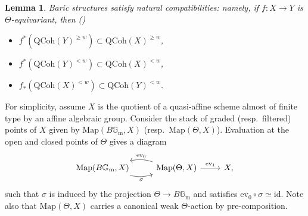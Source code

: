\documentclass{amsart}
\newtheorem{lemma}[theorem]{Lemma}
\theoremstyle{definition}
\theoremstyle{remark}
\numberwithin{equation}{section}
\newcommand{\Gm}{{\mathbb{G}_{\mathrm{m}}}}
\newcommand{\QCoh}{\mathrm{QCoh}}
\newcommand{\id}{\mathrm{id}}
\newcommand{\Map}{\mathrm{Map}}
\newcommand{\ev}{\mathrm{ev}}
\begin{document}
\begin{lemma}{\label{lem: baricnaturality}}
Baric structures satisfy natural compatibilities: namely, if $f: X \to Y$ is $\Theta$-equivariant, then (\cite[Proposition 1.1.2]{HalpernLeistner})
    \begin{itemize}
    \item $f^{\ast}(\QCoh(Y)^{\geq w}) \subset \QCoh(X)^{\geq w}$,
    \item $f^{\ast}(\QCoh(Y)^{< w}) \subset \QCoh(X)^{< w}$,
    \item $f_{\ast}(\QCoh(X)^{< w}) \subset \QCoh(Y)^{< w}$.
\end{itemize}
\end{lemma}


For simplicity, assume $X$ is the quotient of a quasi-affine scheme almost of finite type by an affine algebraic group. Consider the stack of graded (resp.~filtered) points of $X$ given by $\Map(B\Gm, X)$ (resp.~$\Map(\Theta, X)$). Evaluation at the open and closed points of $\Theta$ gives a diagram
\begin{equation*}
    \begin{tikzcd}
        \Map(B\Gm, X) \arrow[r, swap, bend right=15, "{\sigma}"] & \Map( \Theta, X) \arrow[r, "{\ev_1}"] \arrow[l,swap, bend right=15, "{\ev_0}"] & X,
    \end{tikzcd}
\end{equation*}
such that $\sigma$ is induced by the projection $\Theta \rightarrow B\Gm$ and satisfies $\ev_0 \circ \sigma \simeq \id$. Note also that $\Map(\Theta, X)$ carries a canonical weak $\Theta$-action by pre-composition. 
\end{document}
